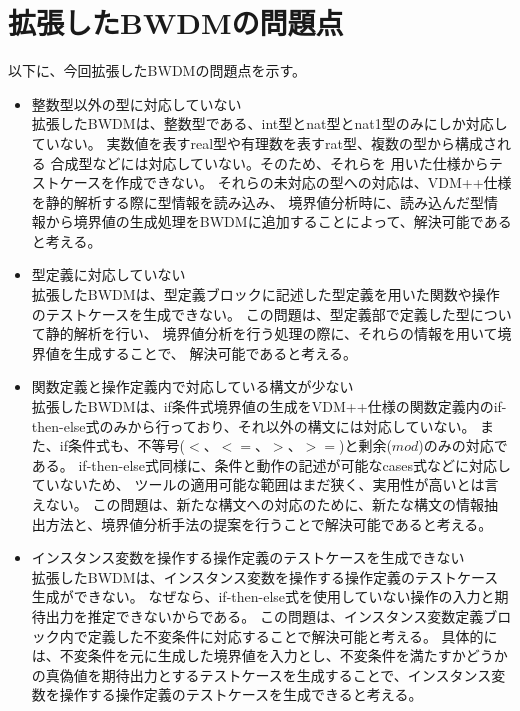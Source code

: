 \documentclass[uplatex, report, a4j, 10pt]{jsbook}
\newcommand{\tool}{BWDM}
\begin{document}
\section{拡張した\tool{}の問題点}
以下に、今回拡張したBWDMの問題点を示す。

\begin{itemize}
  \item 整数型以外の型に対応していない\\
        拡張したBWDMは、整数型である、int型とnat型とnat1型のみにしか対応していない。
        実数値を表すreal型や有理数を表すrat型、複数の型から構成される
        合成型などには対応していない。そのため、それらを
        用いた仕様からテストケースを作成できない。
        それらの未対応の型への対応は、VDM++仕様を静的解析する際に型情報を読み込み、
        境界値分析時に、読み込んだ型情報から境界値の生成処理をBWDMに追加することによって、解決可能であると考える。

  \item 型定義に対応していない\\
        拡張したBWDMは、型定義ブロックに記述した型定義を用いた関数や操作のテストケースを生成できない。
        この問題は、型定義部で定義した型について静的解析を行い、
        境界値分析を行う処理の際に、それらの情報を用いて境界値を生成することで、
        解決可能であると考える。

  \item 関数定義と操作定義内で対応している構文が少ない\\
        拡張したBWDMは、if条件式境界値の生成をVDM++仕様の関数定義内のif-then-else式のみから行っており、それ以外の構文には対応していない。
        また、if条件式も、不等号($<、<=、>、>=$)と剰余($mod$)のみの対応である。
        if-then-else式同様に、条件と動作の記述が可能なcases式などに対応していないため、
        ツールの適用可能な範囲はまだ狭く、実用性が高いとは言えない。
        この問題は、新たな構文への対応のために、新たな構文の情報抽出方法と、境界値分析手法の提案を行うことで解決可能であると考える。

  \item インスタンス変数を操作する操作定義のテストケースを生成できない\\
        拡張したBWDMは、インスタンス変数を操作する操作定義のテストケース生成ができない。
        なぜなら、if-then-else式を使用していない操作の入力と期待出力を推定できないからである。
        この問題は、インスタンス変数定義ブロック内で定義した不変条件に対応することで解決可能と考える。
        具体的には、不変条件を元に生成した境界値を入力とし、不変条件を満たすかどうかの真偽値を期待出力とするテストケースを生成することで、インスタンス変数を操作する操作定義のテストケースを生成できると考える。


\end{itemize}
\end{document}

